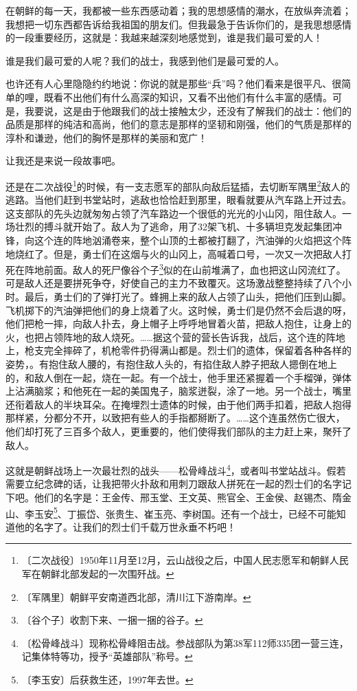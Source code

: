 \documentclass[12pt,UTF-8,openany]{ctexbook}
\begin{document}
\begin{normalsize}
    
    在朝鲜的每一天，我都被一些东西感动着；我的思想感情的潮水，在放纵奔流着；我想把一切东西都告诉给我祖国的朋友们。但我最急于告诉你们的，是我思想感情的一段重要经历，这就是：我越来越深刻地感觉到，谁是我们最可爱的人！
    
    谁是我们最可爱的人呢？我们的战士，我感到他们是最可爱的人。
    
    也许还有人心里隐隐约约地说：你说的就是那些“兵”吗？他们看来是很平凡、很简单的哩，既看不出他们有什么高深的知识，又看不出他们有什么丰富的感情。可是，我要说，这是由于他跟我们的战士接触太少，还没有了解我们的战士：他们的品质是那样的纯洁和高尚，他们的意志是那样的坚韧和刚强，他们的气质是那样的淳朴和谦逊，他们的胸怀是那样的美丽和宽广！
    
    让我还是来说一段故事吧。
    
    还是在二次战役\footnote{〔二次战役〕1950年11月至12月，云山战役之后，中国人民志愿军和朝鲜人民军在朝鲜北部发起的一次围歼战。}的时候，有一支志愿军的部队向敌后猛插，去切断军隅里\footnote{〔军隅里〕朝鲜平安南道西北部，清川江下游南岸。}敌人的逃路。当他们赶到书堂站时，逃敌也恰恰赶到那里，眼看就要从汽车路上开过去。这支部队的先头边就匆匆占领了汽车路边一个很低的光光的小山冈，阻住敌人。一场壮烈的搏斗就开始了。敌人为了逃命，用了32架飞机、十多辆坦克发起集团冲锋，向这个连的阵地汹涌卷来，整个山顶的土都被打翻了，汽油弹的火焰把这个阵地烧红了。但是，勇士们在这烟与火的山冈上，高喊着口号，一次又一次把敌人打死在阵地前面。敌人的死尸像谷个子\footnote{〔谷个子〕收割下来、一捆一捆的谷子。}似的在山前堆满了，血也把这山冈流红了。可是敌人还是要拼死争夺，好使自己的主力不致覆灭。这场激战整整持续了八个小时。最后，勇士们的了弹打光了。蜂拥上来的敌人占领了山头，把他们压到山脚。飞机掷下的汽油弹把他们的身上烧着了火。这时候，勇士们是仍然不会后退的呀，他们把枪一摔，向敌人扑去，身上帽子上呼呼地冒着火苗，把敌人抱住，让身上的火，也把占领阵地的敌人烧死。……据这个营的营长告诉我，战后，这个连的阵地上，枪支完全摔碎了，机枪零件扔得满山都是。烈士们的遗体，保留着各种各样的姿势，。有抱住敌人腰的，有抱住敌人头的，有掐住敌人脖子把敌人摁倒在地上的，和敌人倒在一起，烧在一起。有一个战士，他手里还紧握着一个手榴弹，弹体上沾满脑浆；和他死在一起的美国鬼子，脑浆迸裂，涂了一地。另一个战士，嘴里还衔着敌人的半块耳朵。在掩埋烈士遗体的时候，由于他们两手扣着，把敌人抱得那样紧，分都分不开，以致把有些人的手指都掰断了。……这个连虽然伤亡很大，他们却打死了三百多个敌人，更重要的，他们使得我们部队的主力赶上来，聚歼了敌人。
    
    这就是朝鲜战场上一次最壮烈的战头——松骨峰战斗\footnote{〔松骨峰战斗〕现称松骨峰阻击战。参战部队为第38军112师335团一营三连，记集体特等功，授予“英雄部队”称号。}，或者叫书堂站战斗。假若需要立纪念碑的话，让我把带火扑敌和用刺刀跟敌人拼死在一起的烈士们的名字记下吧。他们的名字是：王金传、邢玉堂、王文英、熊官全、王金侯、赵锡杰、隋金山、李玉安\footnote{〔李玉安〕后获救生还，1997年去世。}、丁振岱、张贵生、崔玉亮、李树国。还有一个战士，已经不可能知道他的名字了。让我们的烈士们千载万世永垂不朽吧！
    

\end{normalsize}
\end{document}
